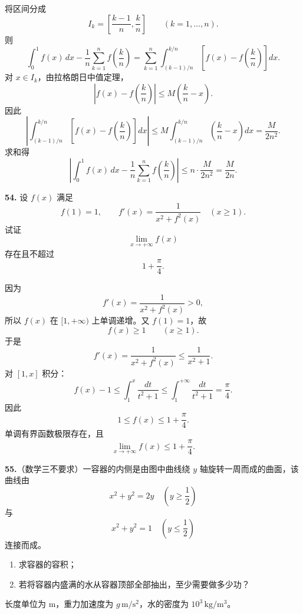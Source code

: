 \begin{solutionblock}
将区间分成
\[
I_k=\left[\frac{k-1}{n},\frac{k}{n}\right]\qquad(k=1,\dots,n).
\]
则
\[
\int_0^1f(x)\,dx-\frac1n\sum_{k=1}^nf\left(\frac{k}{n}\right)
=\sum_{k=1}^n\int_{(k-1)/n}^{k/n}
\left[f(x)-f\left(\frac{k}{n}\right)\right]dx.
\]
对 \(x\in I_k\)，由拉格朗日中值定理，
\[
\left|f(x)-f\left(\frac{k}{n}\right)\right|
\le M\left(\frac{k}{n}-x\right).
\]
因此
\[
\left|\int_{(k-1)/n}^{k/n}
\left[f(x)-f\left(\frac{k}{n}\right)\right]dx\right|
\le M\int_{(k-1)/n}^{k/n}\left(\frac{k}{n}-x\right)dx
=\frac{M}{2n^2}.
\]
求和得
\[
\left|\int_0^1f(x)\,dx-\frac1n\sum_{k=1}^nf\left(\frac{k}{n}\right)\right|
\le n\cdot\frac{M}{2n^2}
=\frac{M}{2n}.
\]
\end{solutionblock}

\begin{problemblock}
\textbf{54.} 设 \(f(x)\) 满足
\[
f(1)=1,\qquad f'(x)=\frac1{x^2+f^2(x)}\quad(x\ge1).
\]
试证
\[
\lim_{x\to+\infty}f(x)
\]
存在且不超过
\[
1+\frac{\pi}{4}.
\]
\end{problemblock}

\begin{solutionblock}
因为
\[
f'(x)=\frac1{x^2+f^2(x)}>0,
\]
所以 \(f(x)\) 在 \([1,+\infty)\) 上单调递增。又 \(f(1)=1\)，故
\[
f(x)\ge1\qquad(x\ge1).
\]
于是
\[
f'(x)=\frac1{x^2+f^2(x)}
\le \frac1{x^2+1}.
\]
对 \([1,x]\) 积分：
\[
f(x)-1
\le \int_1^x\frac{dt}{t^2+1}
\le \int_1^{+\infty}\frac{dt}{t^2+1}
=\frac{\pi}{4}.
\]
因此
\[
1\le f(x)\le1+\frac{\pi}{4}.
\]
单调有界函数极限存在，且
\[
\boxed{\lim_{x\to+\infty}f(x)\le1+\frac{\pi}{4}}.
\]
\end{solutionblock}

\begin{problemblock}
\textbf{55.}（数学三不要求）一容器的内侧是由图中曲线绕 \(y\) 轴旋转一周而成的曲面，该曲线由
\[
x^2+y^2=2y\quad\left(y\ge\frac12\right)
\]
与
\[
x^2+y^2=1\quad\left(y\le\frac12\right)
\]
连接而成。
\begin{enumerate}
\item 求容器的容积；
\item 若将容器内盛满的水从容器顶部全部抽出，至少需要做多少功？
\end{enumerate}
长度单位为 m，重力加速度为 \(g\,\mathrm{m/s^2}\)，水的密度为 \(10^3\,\mathrm{kg/m^3}\)。
\end{problemblock}

